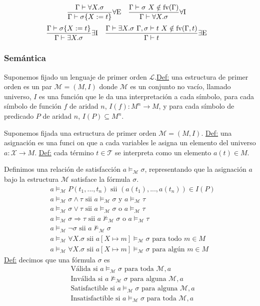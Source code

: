 \documentclass[12pt]{extarticle}
\def\definicion{\newline\underline{Def:} }
\def\modelsM{\models_\mathcal{M}}
\def\ssspace{\space\space\space}
\newcommand\Regla[3]{\frac{\text{#3}}{\text{#2}} \text{#1}}
\begin{document}
$$
\Regla{$\forall$E\ssspace}{$\Gamma \vdash \sigma\{X := t\}$}{$\Gamma \vdash \forall X. \sigma$}
\Regla{$\forall$I\ssspace}{$\Gamma \vdash \forall X. \sigma$}{$\Gamma \vdash \sigma$ $X \notin \text{fv}(\Gamma)$}
$$
$$
\Regla{$\exists$I\ssspace}{$\Gamma \vdash \exists X. \sigma$}{$\Gamma \vdash \sigma\{X := t\}$}
\Regla{$\exists$E\ssspace}{$\Gamma \vdash t$}{$\Gamma \vdash \exists X. \sigma$ $\Gamma, \sigma \vdash t$ $X \notin \text{fv}(\Gamma, t)$}
$$

\subsubsection{Semántica}
Suponemos fijado un lenguaje de primer orden $\mathcal{L}$.\definicion una estructura de primer orden es un par $\mathcal{M} = (M, I)$ donde $\mathcal{M}$ es un conjunto no vacío, llamado universo, $I$ es una función que le da una interpretación a cada símbolo, para cada símbolo de función $f$ de aridad $n$, $I(f): M^n \rightarrow M$, y para cada símbolo de predicado $P$ de aridad $n$, $I(P) \subseteq M^n$.

Suponemos fijada una estructura de primer orden $\mathcal{M} = (M,I)$.
\definicion una asignación es una funci
on que a cada variables le asigna un elemento del universo $a: \mathcal{X} \rightarrow M$.
\definicion cada término $t \in \mathcal{T}$ se interpreta como un elemento $a(t) \in M$.

Definimos una relación de satisfacción $a \models_\mathcal{M} \sigma$, representando que la asignación $a$ bajo la estructura $\mathcal{M}$ satisface la fórmula $\sigma$.
\begin{align*}
  &a \modelsM P(t_1,...,t_n) \text{ sii } (a(t_1),...,a(t_n)) \in I(P) \\
  &a \modelsM \sigma \land \tau \text{ sii } a \modelsM \sigma \text{ y } a \modelsM \tau \\
  &a \modelsM \sigma \lor \tau \text{ sii } a \modelsM \sigma \text{ o } a \modelsM \tau \\
  &a \modelsM \sigma \Rightarrow \tau \text{ sii } a \not\modelsM \sigma \text{ o } a \modelsM \tau \\
  &a \modelsM \neg \sigma \text{ sii } a \not\modelsM \sigma \\
  &a \modelsM \forall X. \sigma \text{ sii } a[X \mapsto m] \modelsM \sigma \text{ para todo } m \in M \\ 
  &a \modelsM \forall X. \sigma \text{ sii } a[X \mapsto m] \modelsM \sigma \text{ para algún } m \in M
\end{align*}
\definicion decimos que una fórmula $\sigma$ es
\begin{align*}
  &\text{Válida si } a \modelsM \sigma \text{ para toda } \mathcal{M}, a \\
  &\text{Inválida si } a \not\modelsM \sigma \text{ para alguna } \mathcal{M}, a \\
  &\text{Satisfactible si } a \modelsM \sigma \text{ para alguna } \mathcal{M}, a \\
  &\text{Insatisfactible si } a \modelsM \sigma \text{ para toda } \mathcal{M}, a
\end{align*}
\end{document}
